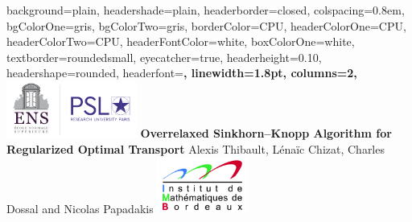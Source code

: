 \documentclass[portrait,a0paper,fontscale=0.35]{baposter} %
\theoremstyle{plain}
\theoremstyle{plain}
\theoremstyle{plain}
\theoremstyle{plain}
\begin{document}
\begin{poster}
{
background=plain,
headershade=plain,
headerborder=closed, %
colspacing=0.8em, %
bgColorOne=gris, %
bgColorTwo=gris, %
borderColor=CPU, %
headerColorOne=CPU, %
headerColorTwo=CPU, %
headerFontColor=white, %
boxColorOne=white, %
textborder=roundedsmall, %
eyecatcher=true, %
headerheight=0.10\textheight, %
headershape=rounded, %
headerfont=\Large\bf\textsc, %
linewidth=1.8pt, %
columns=2,
}
%
{\includegraphics[height=5em]{logo_ens_psl.png}} %
{\bf Overrelaxed Sinkhorn--Knopp Algorithm for Regularized Optimal Transport\vspace{0.2em}} 
{{Alexis Thibault, L\'enaïc Chizat, Charles Dossal and  Nicolas Papadakis}} %
{\includegraphics[height=5em]{logo_imb.png}} %




\end{poster}
\end{document}
